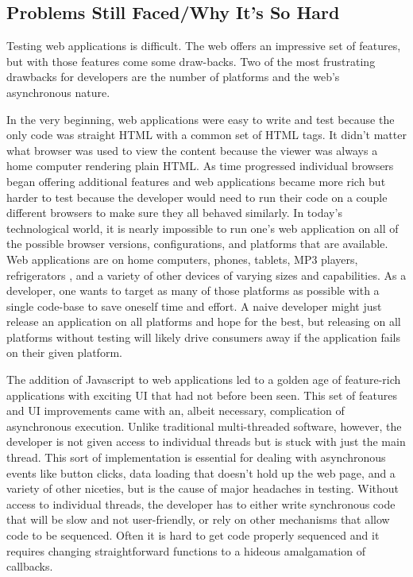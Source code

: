 \documentclass[11pt]{article}
\begin{document}

\subsection{Problems Still Faced/Why It's So Hard}
Testing web applications is difficult. The web offers an impressive set of features, but with those features come some draw-backs. Two of the most frustrating drawbacks for developers are the number of platforms and the web's asynchronous nature.

In the very beginning, web applications were easy to write and test because the only code was straight HTML with a common set of HTML tags. It didn't matter what browser was used to view the content because the viewer was always a home computer rendering plain HTML. As time progressed individual browsers began offering additional features and web applications became more rich but harder to test because the developer would need to run their code on a couple different browsers to make sure they all behaved similarly. In today's technological world, it is nearly impossible to run one's web application on all of the possible browser versions, configurations, and platforms that are available. Web applications are on home computers, phones, tablets, MP3 players, refrigerators \cite{SamsungFridge}, and a variety of other devices of varying sizes and capabilities. As a developer, one wants to target as many of those platforms as possible with a single code-base to save oneself time and effort. A naive developer might just release an application on all platforms and hope for the best, but releasing on all platforms without testing will likely drive consumers away if the application fails on their given platform.

The addition of Javascript to web applications led to a golden age of feature-rich applications with exciting UI that had not before been seen. This set of features and UI improvements came with an, albeit necessary, complication of asynchronous execution. Unlike traditional multi-threaded software, however, the developer is not given access to individual threads but is stuck with just the main thread. This sort of implementation is essential for dealing with asynchronous events like button clicks, data loading that doesn't hold up the web page, and a variety of other niceties, but is the cause of major headaches in testing. Without access to individual threads, the developer has to either write synchronous code that will be slow and not user-friendly, or rely on other mechanisms that allow code to be sequenced. Often it is hard to get code properly sequenced and it requires changing straightforward functions to a hideous amalgamation of callbacks.
\end{document}
